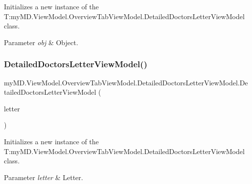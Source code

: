 Initializes a new instance of the T\+:my\+M\+D.\+View\+Model.\+Overview\+Tab\+View\+Model.\+Detailed\+Doctors\+Letter\+View\+Model class. 


\begin{DoxyParams}{Parameter}
{\em obj} & Object.\\
\hline
\end{DoxyParams}
\mbox{\label{classmy_m_d_1_1_view_model_1_1_overview_tab_view_model_1_1_detailed_doctors_letter_view_model_aa879528b83398ced704ca2be3b63bb3d}} 
\subsubsection{\texorpdfstring{Detailed\+Doctors\+Letter\+View\+Model()}{DetailedDoctorsLetterViewModel()}\hspace{0.1cm}{\footnotesize\ttfamily [2/2]}}
{\footnotesize\ttfamily my\+M\+D.\+View\+Model.\+Overview\+Tab\+View\+Model.\+Detailed\+Doctors\+Letter\+View\+Model.\+Detailed\+Doctors\+Letter\+View\+Model (\begin{DoxyParamCaption}\item[{\mbox{\hyperlink{interfacemy_m_d_1_1_model_interface_1_1_data_model_interface_1_1_i_doctors_letter}{I\+Doctors\+Letter}}}]{letter }\end{DoxyParamCaption})}



Initializes a new instance of the T\+:my\+M\+D.\+View\+Model.\+Overview\+Tab\+View\+Model.\+Detailed\+Doctors\+Letter\+View\+Model class. 


\begin{DoxyParams}{Parameter}
{\em letter} & Letter.\\
\hline
\end{DoxyParams}


